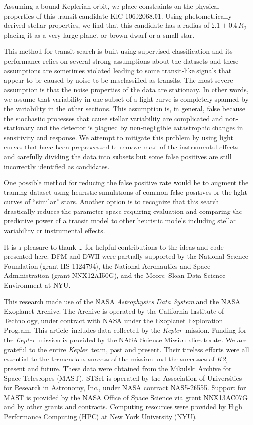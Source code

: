 \documentclass[preprint]{aastex}
\newcommand{\project}[1]{\textsl{#1}}
\newcommand{\kepler}{\project{Kepler}}
\newcommand{\KT}{\project{K2}}
\newcommand{\paper}{article}
\begin{document}
Assuming a bound Keplerian orbit, we place constraints on the physical
properties of this transit candidate KIC 10602068.01.
Using photometrically derived stellar properties, we find that this candidate
has a radius of $2.1 \pm 0.4\,R_\mathrm{J}$ placing it as a very large planet
or brown dwarf or a small star.

This method for transit search is built using supervised classification and
its performance relies on several strong assumptions about the datasets and
these assumptions are sometimes violated leading to some transit-like signals
that appear to be caused by noise to be misclassified as transits.
The most severe assumption is that the noise properties of the data are
stationary.
In other words, we assume that variability in one subset of a light curve is
completely spanned by the variability in the other sections.
This assumption is, in general, false because the stochastic processes that
cause stellar variability are complicated and non-stationary and the detector
is plagued by non-negligible catastrophic changes in sensitivity and response.
We attempt to mitigate this problem by using light curves that have been
preprocessed to remove most of the instrumental effects and carefully dividing
the data into subsets but some false positives are still incorrectly
identified as candidates.

One possible method for reducing the false positive rate would be to augment
the training dataset using heuristic simulations of common false positives or
the light curves of ``similar'' stars.
Another option is to recognize that this search drastically reduces the
parameter space requiring evaluation and comparing the predictive power of
a transit model to other heuristic models including stellar variability or
instrumental effects.


\acknowledgments
It is a pleasure to thank
\ldots
for helpful contributions to the ideas and code presented here.
DFM and DWH were partially supported by the National Science Foundation
(grant IIS-1124794),
the National Aeronautics and Space Administration
(grant NNX12AI50G), and the Moore--Sloan Data Science Environment at NYU.

This research made use of the NASA \project{Astrophysics Data System} and the
NASA Exoplanet Archive.
The Archive is operated by the California Institute of Technology, under
contract with NASA under the Exoplanet Exploration Program.
This \paper\ includes data collected by the \kepler\ mission. Funding for the
\kepler\ mission is provided by the NASA Science Mission directorate.
We are grateful to the entire \kepler\ team, past and present.
Their tireless efforts were all essential to the tremendous success of the mission
and the successes of \KT, present and future.
These data were obtained from the Mikulski Archive for Space Telescopes
(MAST).
STScI is operated by the Association of Universities for Research in
Astronomy, Inc., under NASA contract NAS5-26555.
Support for MAST is provided by the NASA Office of Space Science via grant
NNX13AC07G and by other grants and contracts.
Computing resources were provided by High Performance Computing (HPC) at New
York University (NYU).
\end{document}
